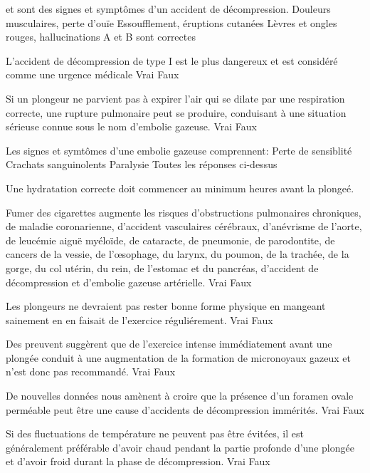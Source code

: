 \documentclass[english,12pt,a4paper]{article}
\begin{document}
\begin{outline}
		\1 \underline{\hspace{1.5cm}} et \underline{\hspace{1.5cm}} sont des signes et symptômes d'un accident de décompression.
			\2 Douleurs musculaires, perte d'ouïe
			\2 Essoufflement, éruptions cutanées
			\2 Lèvres et ongles rouges, hallucinations
			\2 A et B sont correctes

		\1 L'accident de décompression de type I est le plus dangereux et est considéré comme une urgence médicale
			\2 Vrai
			\2 Faux

		\1 Si un plongeur ne parvient pas à expirer l'air qui se dilate par une respiration correcte, une rupture pulmonaire peut se produire, conduisant à une situation sérieuse connue sous le nom d'embolie gazeuse.
			\2 Vrai
			\2 Faux

		\1 Les signes et symtômes d'une embolie gazeuse comprennent:
			\2 Perte de sensiblité
			\2 Crachats sanguinolents
			\2 Paralysie
			\2 Toutes les réponses ci-dessus

		\1 Une hydratation correcte doit commencer au minimum	\underline{\hspace{1.5cm}} heures avant la plongeé.

		\1 Fumer des cigarettes augmente les risques d'obstructions pulmonaires chroniques, de maladie coronarienne, d'accident vasculaires cérébraux, d'anévrisme de l'aorte, de leucémie aiguë myéloïde, de cataracte, de pneumonie, de parodontite, de cancers de la vessie, de l'œsophage, du larynx, du poumon, de la trachée, de la gorge, du col utérin, du rein, de l'estomac et du pancréas, d'accident de décompression et d'embolie gazeuse artérielle.
			\2 Vrai
			\2 Faux

		\1 Les plongeurs ne devraient pas rester bonne forme physique en mangeant sainement en en faisait de l'exercice réguliérement.
			\2 Vrai
			\2 Faux

		\1 Des preuvent suggèrent que de l'exercice intense immédiatement avant une plongée conduit à une augmentation de la formation de micronoyaux gazeux et n'est donc pas recommandé.
			\2 Vrai
			\2 Faux

		\1 De nouvelles données nous amènent à croire que la présence d'un foramen ovale perméable peut être une cause d'accidents de décompression immérités.
			\2 Vrai
			\2 Faux

		\1 Si des fluctuations de température ne peuvent pas être évitées, il est généralement préférable d'avoir chaud pendant la partie profonde d'une plongée et d'avoir froid durant la phase de décompression.
			\2 Vrai
			\2 Faux


\end{outline}
\end{document}
